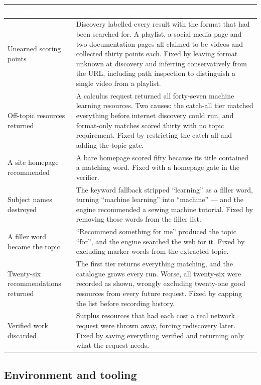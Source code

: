 \documentclass[11pt,a4paper]{article}
\newcommand{\thead}[1]{\textcolor{white}{\bfseries\small #1}}
\newcommand{\headrow}{\rowcolor{navy}}
\begin{document}
\vspace{4pt}
\begin{tabularx}{\textwidth}{>{\raggedright\arraybackslash}p{4cm} >{\raggedright\arraybackslash}X}
\headrow \thead{Problem} & \thead{Cause and resolution} \\
\midrule
Unearned scoring points & Discovery labelled every result with the format that had been searched for. A playlist, a social-media page and two documentation pages all claimed to be videos and collected thirty points each. Fixed by leaving format unknown at discovery and inferring conservatively from the URL, including path inspection to distinguish a single video from a playlist. \\
\rowcolor{altshade} Off-topic resources returned & A calculus request returned all forty-seven machine learning resources. Two causes: the catch-all tier matched everything before internet discovery could run, and format-only matches scored thirty with no topic requirement. Fixed by restricting the catch-all and adding the topic gate. \\
A site homepage recommended & A bare homepage scored fifty because its title contained a matching word. Fixed with a homepage gate in the verifier. \\
\rowcolor{altshade} Subject names destroyed & The keyword fallback stripped ``learning'' as a filler word, turning ``machine learning'' into ``machine'' --- and the engine recommended a sewing machine tutorial. Fixed by removing those words from the filler list. \\
A filler word became the topic & ``Recommend something for me'' produced the topic ``for'', and the engine searched the web for it. Fixed by excluding marker words from the extracted topic. \\
\rowcolor{altshade} Twenty-six recommendations returned & The first tier returns everything matching, and the catalogue grows every run. Worse, all twenty-six were recorded as shown, wrongly excluding twenty-one good resources from every future request. Fixed by capping the list before recording history. \\
Verified work discarded & Surplus resources that had each cost a real network request were thrown away, forcing rediscovery later. Fixed by saving everything verified and returning only what the request needs. \\
\bottomrule
\end{tabularx}

\subsection{Environment and tooling}
\end{document}
